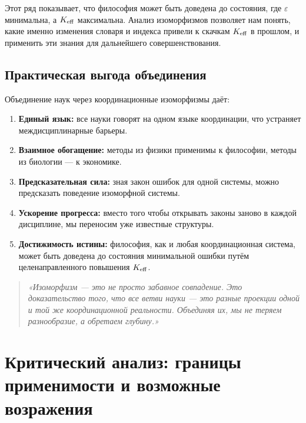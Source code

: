 \documentclass[12pt,a4paper]{article}
\newcommand{\eps}{\varepsilon}
\begin{document}
	Этот ряд показывает, что философия может быть доведена до состояния, где \(\eps\) минимальна, а \(\Keff\) максимальна. Анализ изоморфизмов позволяет нам понять, какие именно изменения словаря и индекса привели к скачкам \(\Keff\) в прошлом, и применить эти знания для дальнейшего совершенствования.
	
	\subsection{Практическая выгода объединения}
	
	Объединение наук через координационные изоморфизмы даёт:
	
	\begin{enumerate}
		\item \textbf{Единый язык:} все науки говорят на одном языке координации, что устраняет междисциплинарные барьеры.
		\item \textbf{Взаимное обогащение:} методы из физики применимы к философии, методы из биологии — к экономике.
		\item \textbf{Предсказательная сила:} зная закон ошибок для одной системы, можно предсказать поведение изоморфной системы.
		\item \textbf{Ускорение прогресса:} вместо того чтобы открывать законы заново в каждой дисциплине, мы переносим уже известные структуры.
		\item \textbf{Достижимость истины:} философия, как и любая координационная система, может быть доведена до состояния минимальной ошибки путём целенаправленного повышения \(\Keff\).
	\end{enumerate}
	
	\begin{quote}
		\itshape
		«Изоморфизм — это не просто забавное совпадение. Это доказательство того, что все ветви науки — это разные проекции одной и той же координационной реальности. Объединяя их, мы не теряем разнообразие, а обретаем глубину.»
	\end{quote}
	
	
	\section{Критический анализ: границы применимости и возможные возражения}
	\label{sec:critical-analysis}
	
\end{document}
